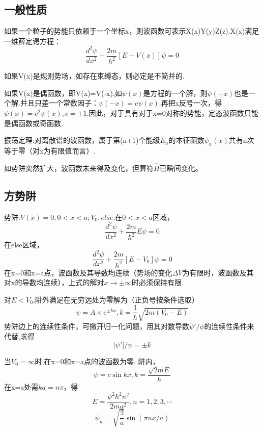 \documentclass[13pt,a4paper]{article}
\begin{document}
\begin{CJK}{UTF8}{song}
\subsection{一般性质}
如果一个粒子的势能只依赖于一个坐标x，则波函数可表示X(x)Y(y)Z(z).X(x)满足一维薛定谔方程：$$\frac{d^2\psi}{dx^2}+\frac{2m}{\hbar^2}[E-V(x)]\psi=0$$ 

如果V(x)是规则势场，如存在束缚态，则必定是不简并的.

如果V(x)是偶函数，即V(x)=V(-x),如$\psi(x)$是方程的一个解，则$\psi(-x)$也是一个解.并且只差一个常数因子：$\psi(-x)=c\psi(x)$.再把x反号一次，得$\psi(x)=c^2\psi(x),c=\pm 1$.因此，对于具有对于x=0对称的势能，定态波函数只能是偶函数或奇函数.

振荡定理:对离散谱的波函数，属于第(n+1)个能级$E_n$的本征函数$\psi_n(x)$共有n次等于零（对x为有限值而言）.

如势阱突然扩大，波函数未来得及变化，但算符$\hat{H}$已瞬间变化。

\subsection{方势阱}

势阱:$V(x)=0,0<x<a;V_0,else$.在$0<x<a$区域，$$\frac{d^2\psi}{dx^2}+\frac{2m}{\hbar^2}E\psi=0$$在else区域，$$\frac{d^2\psi}{dx^2}+\frac{2m}{\hbar^2}[E-V_0]\psi=0$$ 
在x=0和x=a点，波函数及其导数均连续（势场的变化$\Delta V$为有限时，波函数及其对x的导数均连续），上式的解对$x\rightarrow \pm\infty$时必须保持有限.

对$E<V_0$,阱外满足在无穷远处为零解为（正负号按条件选取）$$\psi=A\times e^{\pm kx},k=\frac{1}{\hbar}\sqrt{2m(V_0-E)}$$
势阱边上的连续性条件，可撇开归一化问题，用其对数导数$\psi'/\psi$的连续性条件来代替,求得$$|\psi'|/\psi=\pm k$$

当$V_0=\infty$时,在x=0和x=a点的波函数为零. 阱内，$$\psi=c\sin kx,k=\frac{\sqrt{2mE}}{\hbar}$$
在x=a处需$ka=n\pi$，得$$E=\frac{\psi^2\hbar^2n^2}{2ma^2},n=1,2,3,\cdots$$
$$\psi_n=\sqrt{\frac{2}{a}}\sin(\pi nx/a)$$




\end{CJK}
\end{document}
